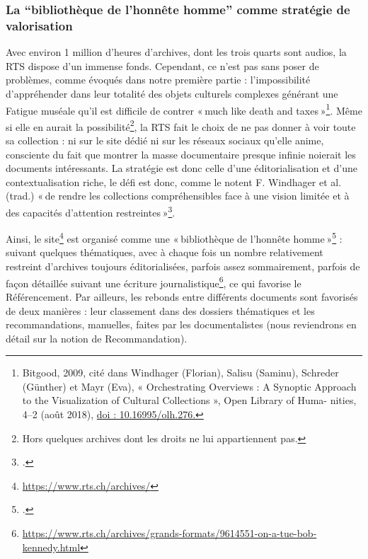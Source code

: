 \subsubsection{La \enquote{bibliothèque de l'honnête homme} comme stratégie de valorisation }


Avec environ 1 million d’heures d’archives, dont les trois quarts sont audios, la RTS dispose d’un immense fonds. Cependant, ce n’est pas sans poser de problèmes, comme évoqués dans notre première partie : l’impossibilité d’appréhender dans leur totalité des objets culturels complexes générant une Fatigue muséale qu’il est difficile de contrer « much like death and taxes »\footnote{Bitgood, 2009, cité dans Windhager (Florian), Salisu (Saminu), Schreder (Günther) et Mayr (Eva), « Orchestrating Overviews : A
	Synoptic Approach to the Visualization of Cultural Collections », Open Library of Huma-
	nities, 4–2 (août 2018), \url{doi : 10.16995/olh.276.}}. Même si elle en aurait la possibilité\footnote{Hors quelques archives dont les droits ne lui appartiennent pas.}, la RTS fait le choix de ne pas donner à voir toute sa collection : ni sur le site dédié ni sur les réseaux sociaux qu’elle anime, consciente du fait que montrer la masse documentaire presque infinie noierait les documents intéressants. La stratégie est donc celle d’une éditorialisation et d’une contextualisation riche, le défi est donc, comme le notent F. Windhager et al. (trad.) « de rendre les collections compréhensibles face à une vision limitée et à des capacités d’attention restreintes »\footcite[p. 3]{windhager2018a}.

Ainsi, le site\footnote{\url{ https://www.rts.ch/archives/}} est organisé comme une « bibliothèque de l’honnête homme »\footcite{chatelain2003} : suivant quelques thématiques, avec à chaque fois un nombre relativement restreint d’archives toujours éditorialisées, parfois assez sommairement, parfois de façon détaillée suivant une écriture journalistique\footnote{\url{ https://www.rts.ch/archives/grands-formats/9614551-on-a-tue-bob-kennedy.html}}, ce qui favorise le Référencement. Par ailleurs, les rebonds entre différents documents sont favorisés de deux manières : leur classement dans des dossiers thématiques et les recommandations, manuelles, faites par les documentalistes (nous reviendrons en détail sur la notion de Recommandation).


